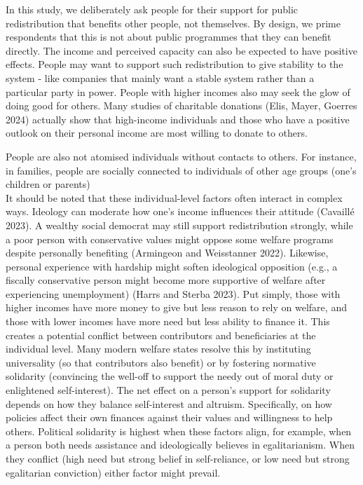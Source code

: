\documentclass[12pt]{article}
\begin{document}
In this study, we deliberately ask people for their support for public
redistribution that benefits other people, not themselves. By design, we
prime respondents that this is not about public programmes that they can
benefit directly. The income and perceived capacity can also be expected
to have positive effects. People may want to support such redistribution
to give stability to the system - like companies that mainly want a
stable system rather than a particular party in power. People with
higher incomes also may seek the glow of doing good for others. Many
studies of charitable donations (Elis, Mayer, Goerres 2024) actually
show that high-income individuals and those who have a positive outlook
on their personal income are most willing to donate to others.

People are also not atomised individuals without contacts to others. For
instance, in families, people are socially connected to individuals of
other age groups (one's children or parents)\\
It should be noted that these individual-level factors often interact in
complex ways. Ideology can moderate how one's income influences their
attitude (Cavaillé 2023). A wealthy social democrat may still support
redistribution strongly, while a poor person with conservative values
might oppose some welfare programs despite personally benefiting
(Armingeon and Weisstanner 2022). Likewise, personal experience with
hardship might soften ideological opposition (e.g., a fiscally
conservative person might become more supportive of welfare after
experiencing unemployment) (Harrs and Sterba 2023). Put simply, those
with higher incomes have more money to give but less reason to rely on
welfare, and those with lower incomes have more need but less ability to
finance it. This creates a potential conflict between contributors and
beneficiaries at the individual level. Many modern welfare states
resolve this by instituting universality (so that contributors also
benefit) or by fostering normative solidarity (convincing the well-off
to support the needy out of moral duty or enlightened self-interest).
The net effect on a person's support for solidarity depends on how they
balance self-interest and altruism. Specifically, on how policies affect
their own finances against their values and willingness to help others.
Political solidarity is highest when these factors align, for example,
when a person both needs assistance and ideologically believes in
egalitarianism. When they conflict (high need but strong belief in
self-reliance, or low need but strong egalitarian conviction) either
factor might prevail.
\end{document}

